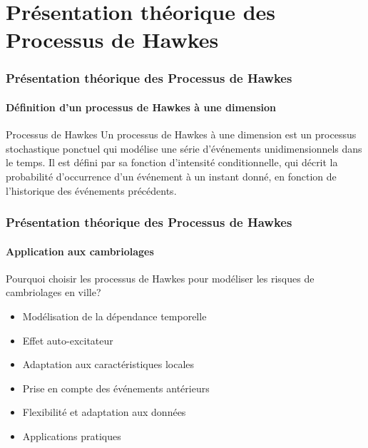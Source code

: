 \section[Théorie]{Présentation théorique des Processus de Hawkes}

\begin{frame}
	\frametitle{Présentation théorique des Processus de Hawkes}
	\framesubtitle{Définition d'un processus de Hawkes à une dimension}

	\begin{block}{Processus de Hawkes}
		Un processus de Hawkes à une dimension est un processus stochastique ponctuel qui modélise une série d'événements unidimensionnels dans le temps. Il est défini par sa fonction d'intensité conditionnelle, qui décrit la probabilité d'occurrence d'un événement à un instant donné, en fonction de l'historique des événements précédents.
	\end{block}

\end{frame}

\begin{frame}
    \frametitle{Présentation théorique des Processus de Hawkes}
    \framesubtitle{Application aux cambriolages}

    \begin{block}{Pourquoi choisir les processus de Hawkes pour modéliser les risques de cambriolages en ville?}

        \begin{itemize}
            \item Modélisation de la dépendance temporelle
            \item Effet auto-excitateur
            \item Adaptation aux caractéristiques locales
            \item Prise en compte des événements antérieurs
            \item Flexibilité et adaptation aux données
            \item Applications pratiques
        \end{itemize}
    \end{block}
\end{frame}


